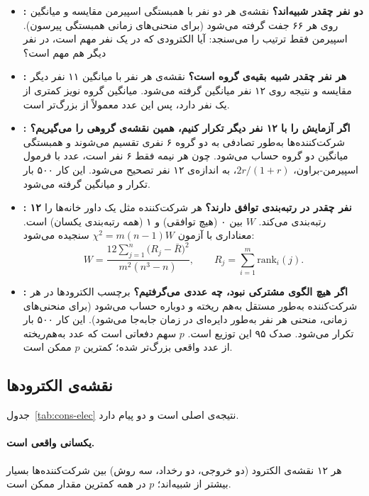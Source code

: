 \begin{itemize}
\item \textbf{: دو نفر چقدر شبیه‌اند؟} نقشه‌ی هر دو نفر با همبستگی اسپیرمن مقایسه و میانگین روی هر ۶۶ جفت گرفته می‌شود (برای منحنی‌های زمانی همبستگی پیرسون). اسپیرمن فقط ترتیب را می‌سنجد: آیا الکترودی که در یک نفر مهم است، در نفر دیگر هم مهم است؟
\item \textbf{: هر نفر چقدر شبیه بقیه‌ی گروه است؟} نقشه‌ی هر نفر با میانگین ۱۱ نفر دیگر مقایسه و نتیجه روی ۱۲ نفر میانگین گرفته می‌شود. میانگین گروه نویز کمتری از یک نفر دارد، پس این عدد معمولاً از  بزرگ‌تر است.
\item \textbf{: اگر آزمایش را با ۱۲ نفر دیگر تکرار کنیم، همین نقشه‌ی گروهی را می‌گیریم؟} شرکت‌کننده‌ها به‌طور تصادفی به دو گروه ۶ نفری تقسیم می‌شوند و همبستگی میانگین دو گروه حساب می‌شود. چون هر نیمه فقط ۶ نفر است، عدد با فرمول اسپیرمن-براون، $2r/(1+r)$، به اندازه‌ی ۱۲ نفر تصحیح می‌شود. این کار ۵۰۰ بار تکرار و میانگین گرفته می‌شود.
\item \textbf{: ۱۲ نفر چقدر در رتبه‌بندی توافق دارند؟} هر شرکت‌کننده مثل یک داور خانه‌ها را رتبه‌بندی می‌کند. $W$ بین ۰ (هیچ توافقی) و ۱ (همه رتبه‌بندی یکسان) است. معناداری با آزمون $\chi^2=m(n-1)W$ سنجیده می‌شود:
\begin{equation}
W=\frac{12\sum_{j=1}^{n}\big(R_j-\bar R\big)^2}{m^2(n^3-n)},\qquad R_j=\sum_{i=1}^{m}\mathrm{rank}_i(j).
\end{equation}
\item \textbf{: اگر هیچ الگوی مشترکی نبود، چه عددی می‌گرفتیم؟} برچسب الکترودها در هر شرکت‌کننده به‌طور مستقل به‌هم ریخته و  دوباره حساب می‌شود (برای منحنی‌های زمانی، منحنی هر نفر به‌طور دایره‌ای در زمان جابه‌جا می‌شود). این کار ۵۰۰ بار تکرار می‌شود.  صدک ۹۵ این توزیع است. $p$ سهم دفعاتی است که عدد به‌هم‌ریخته از عدد واقعی بزرگ‌تر شده؛ کمترین $p$ ممکن  است.
\end{itemize}

\subsection{نقشه‌ی الکترودها}



جدول~\ref{tab:cons-elec} نتیجه‌ی اصلی است و دو پیام دارد.

\paragraph{یکسانی واقعی است.} هر ۱۲ نقشه‌ی الکترود (دو خروجی، دو رخداد، سه روش) بین شرکت‌کننده‌ها بسیار بیشتر از  شبیه‌اند؛ $p$ در همه کمترین مقدار ممکن است.

